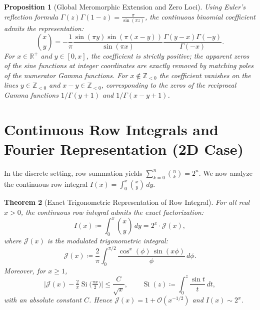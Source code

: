 \documentclass[11pt,a4paper]{article}
\theoremstyle{plain}
\newtheorem{theorem}{Theorem}[section]
\newtheorem{proposition}[theorem]{Proposition}
\theoremstyle{definition}
\theoremstyle{remark}
\numberwithin{equation}{section}
\begin{document}
\begin{proposition}[Global Meromorphic Extension and Zero Loci]
\label{prop:meromorphic_zero_loci}
Using Euler's reflection formula $\Gamma(z)\Gamma(1-z) = \frac{\pi}{\sin(\pi z)}$, the continuous binomial coefficient admits the representation:
\begin{equation}
\binom{x}{y} = -\frac{1}{\pi}\frac{\sin(\pi y)\sin(\pi(x-y))}{\sin(\pi x)} \frac{\Gamma(y-x)\Gamma(-y)}{\Gamma(-x)}.
\end{equation}
For $x \in \mathbb{R}^+$ and $y \in [0, x]$, the coefficient is strictly positive; the apparent zeros of the sine functions at integer coordinates are exactly removed by matching poles of the numerator Gamma functions. For $x \notin \mathbb{Z}_{<0}$ the coefficient vanishes on the lines $y \in \mathbb{Z}_{<0}$ and $x - y \in \mathbb{Z}_{<0}$, corresponding to the zeros of the reciprocal Gamma functions $1/\Gamma(y+1)$ and $1/\Gamma(x-y+1)$.
\end{proposition}

\section{Continuous Row Integrals and Fourier Representation (2D Case)}

In the discrete setting, row summation yields $\sum_{k=0}^n \binom{n}{k} = 2^n$. We now analyze the continuous row integral $I(x) = \int_0^x \binom{x}{y}\,dy$.

\begin{theorem}[Exact Trigonometric Representation of Row Integral]
\label{thm:2d_row_integral}
For all real $x > 0$, the continuous row integral admits the exact factorization:
\begin{equation}
I(x) \coloneqq \int_0^x \binom{x}{y}\,dy = 2^x \cdot \mathcal{J}(x),
\end{equation}
where $\mathcal{J}(x)$ is the modulated trigonometric integral:
\begin{equation}
\mathcal{J}(x) \coloneqq \frac{2}{\pi}\int_0^{\pi/2} \frac{\cos^x(\phi)\,\sin(x\phi)}{\phi}\,d\phi.
\end{equation}
Moreover, for $x \ge 1$,
\begin{equation}
\label{eq:J_rate}
\Big|\mathcal{J}(x) - \tfrac{2}{\pi}\operatorname{Si}\!\big(\tfrac{\pi x}{2}\big)\Big| \le \frac{C}{\sqrt{x}}, \qquad \operatorname{Si}(z) \coloneqq \int_0^z \frac{\sin t}{t}\,dt,
\end{equation}
with an absolute constant $C$. Hence $\mathcal{J}(x) = 1 + \mathcal{O}(x^{-1/2})$ and $I(x) \sim 2^x$.
\end{theorem}
\end{document}
